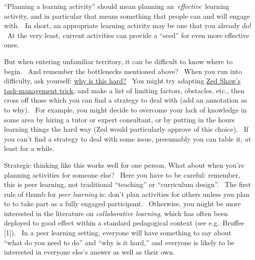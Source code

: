``Planning a learning activity'' should mean planning
an~\emph{effective}~learning activity, and in particular that means
something that people can and will engage with. ~In short, an
appropriate learning activity may be one that you already do! ~At the
very least, current activities can provide a ``seed'' for even more
effective ones.

But when entering unfamiliar territory, it can be difficult to know
where to begin.~ And remember the bottlenecks mentioned above?~ When you
run into difficulty, ask yourself:
\href{http://peeragogy.org/patterns-and-heuristics/}{why is this hard?}~
You might try adapting
\href{http://learnpythonthehardway.org/book/intro.html\#comment-409972596}{Zed
Shaw's task-management trick}, and make a list of limiting factors,
obstacles, etc., then cross off those which you can find a strategy to
deal with (add an annotation as to why). ~For example, you might decide
to overcome your lack of knowledge in some area by hiring a tutor or
expert consultant, or by putting in the hours learning things the hard
way (Zed would particularly approve of this choice).~ If you can't find
a strategy to deal with some issue, presumably you can table it, at
least for a while.

Strategic thinking like this works well for one person. What about
when you're planning activities for someone else? ~Here you have to be
careful: remember, this is peer learning, not traditional ``teaching''
or ``curriculum design''. ~The first rule of thumb for \emph{peer
learning} is: don't plan activities for others unless you plan to to
take part as a fully engaged participant.~ Otherwise, you might be
more interested in the literature on \emph{collaborative learning},
which has often been deployed to good effect within a standard
pedagogical context (see e.g.~Bruffee {[}1{]}).~ In a peer learning
setting, everyone will have something to say about~ ``what do you need
to do'' and ``why is it hard,'' and everyone is likely to be
interested in everyone else's answer as well as their own.


